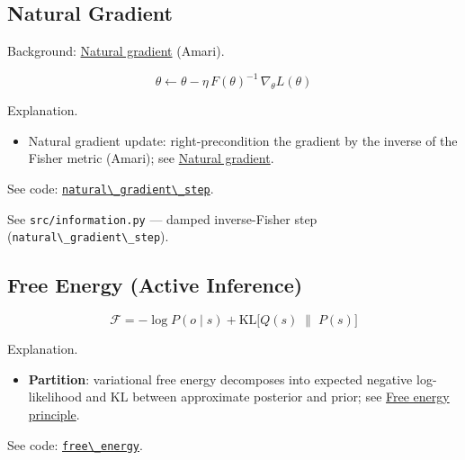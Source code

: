 \documentclass[
  10pt,
]{article}
\newcommand{\passthrough}[1]{#1}
\providecommand{\tightlist}{%
  \setlength{\itemsep}{0pt}\setlength{\parskip}{0pt}}
\begin{document}
\hypertarget{eq:natgrad}{%
\subsection{Natural Gradient}\label{eq:natgrad}}

Background:
\href{https://en.wikipedia.org/wiki/Natural_gradient}{Natural gradient}
(Amari).

\begin{equation}\label{eq:natural_gradient}
\theta \leftarrow \theta - \eta\, F(\theta)^{-1}\, \nabla_{\theta} L(\theta)
\end{equation}

Explanation.

\begin{itemize}
\tightlist
\item
  Natural gradient update: right-precondition the gradient by the
  inverse of the Fisher metric (Amari); see
  \href{https://en.wikipedia.org/wiki/Natural_gradient}{Natural
  gradient}.
\end{itemize}

See code:
\href{03_quadray_methods.md\#code:natural_gradient_step}{\passthrough{\lstinline!natural\_gradient\_step!}}.

See \passthrough{\lstinline!src/information.py!} --- damped
inverse-Fisher step (\passthrough{\lstinline!natural\_gradient\_step!}).

\hypertarget{eq:free_energy}{%
\subsection{Free Energy (Active Inference)}\label{eq:free_energy}}

\begin{equation}\label{eq:free_energy}
\mathcal{F} = -\log P(o\mid s) + \mathrm{KL}\big[ Q(s)\;\|\; P(s) \big]
\end{equation}

Explanation.

\begin{itemize}
\tightlist
\item
  \textbf{Partition}: variational free energy decomposes into expected
  negative log-likelihood and KL between approximate posterior and
  prior; see
  \href{https://en.wikipedia.org/wiki/Free_energy_principle}{Free energy
  principle}.
\end{itemize}

See code:
\href{03_quadray_methods.md\#code:free_energy}{\passthrough{\lstinline!free\_energy!}}.
\end{document}
